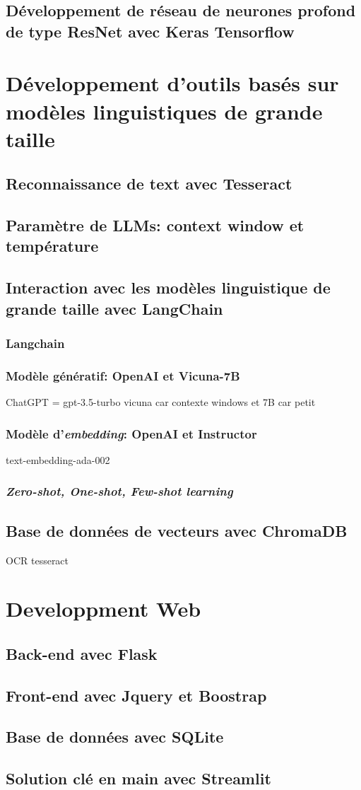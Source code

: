 \subsection{Développement de réseau de neurones profond de type ResNet avec Keras Tensorflow}
\section{Développement d'outils basés sur modèles linguistiques de grande taille}
\subsection{Reconnaissance de text avec Tesseract}
\subsection{Paramètre de LLMs: context window et température}
\subsection{Interaction avec les modèles linguistique de grande taille avec LangChain}
\subsubsection{Langchain}
\subsubsection{Modèle génératif: OpenAI et Vicuna-7B}
ChatGPT = gpt-3.5-turbo
vicuna car contexte windows et 7B car petit
\subsubsection{Modèle d'\textit{embedding}: OpenAI et Instructor}
text-embedding-ada-002
\subsubsection{\textit{Zero-shot, One-shot, Few-shot learning}}
\subsection{Base de données de vecteurs avec ChromaDB}
OCR tesseract
\section{Developpment Web}
\subsection{Back-end avec Flask}
\subsection{Front-end avec Jquery et Boostrap}
\subsection{Base de données avec SQLite}
\subsection{Solution clé en main avec Streamlit}
